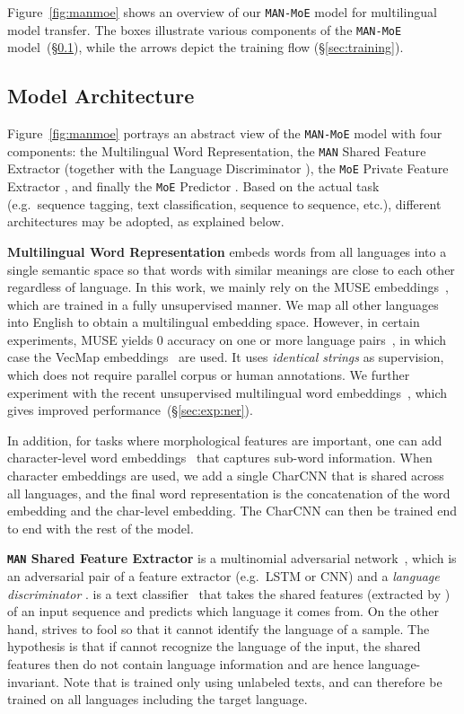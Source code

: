 \documentclass[11pt,a4paper]{article}
\newcommand{\secref}[1]{\S\ref{#1}}
\newcommand{\manmoe}{\texttt{MAN-MoE}}
\newcommand{\man}{\texttt{MAN}}
\newcommand{\moe}{\texttt{MoE}}
\begin{document}
Figure~\ref{fig:manmoe} shows an overview of our \manmoe{} model for multilingual model transfer.
The boxes illustrate various components of the \manmoe{} model~(\secref{sec:model_arch}), while the arrows depict the training flow (\secref{sec:training}).

\subsection{Model Architecture}\label{sec:model_arch}

Figure~\ref{fig:manmoe} portrays an abstract view of the \manmoe{} model with four components: the Multilingual Word Representation, the \man{} Shared Feature Extractor  (together with the Language Discriminator ), the \moe{} Private Feature Extractor , and finally the \moe{} Predictor .
Based on the actual task (e.g.~sequence tagging, text classification, sequence to sequence, etc.), different architectures may be adopted, as explained below.

\noindent\textbf{Multilingual Word Representation}
embeds words from all languages into a single semantic space so that words with similar meanings are close to each other regardless of language.
In this work, we mainly rely on the MUSE embeddings~\citep{lample2018word}, which are trained in a fully unsupervised manner.
We map all other languages into English to obtain a multilingual embedding space.
However, in certain experiments, MUSE yields 0 accuracy on one or more language pairs~\citep{P18-1072}, in which case the VecMap embeddings~\citep{P17-1042} are used.
It uses \emph{identical strings} as supervision, which does not require parallel corpus or human annotations.
We further experiment with the recent unsupervised multilingual word embeddings~\cite{chen2018umwe}, which gives improved performance~(\secref{sec:exp:ner}).

In addition, for tasks where morphological features are important, one can add character-level word embeddings~\citep{DosSantos:2014:LCR:3044805.3045095} that captures sub-word information.
When character embeddings are used, we add a single CharCNN that is shared across all languages, and the final word representation is the concatenation of the word embedding and the char-level embedding. The CharCNN can then be trained end to end with the rest of the model.

\noindent\textbf{\man{} Shared Feature Extractor}
 is a multinomial adversarial network~\citep{N18-1111}, which is an adversarial pair of a feature extractor (e.g.~LSTM or CNN) and a \emph{language discriminator} .
 is a text classifier~\citep{D14-1181} that takes the shared features (extracted by ) of an input sequence and predicts which language it comes from.
On the other hand,  strives to fool  so that it cannot identify the language of a sample.
The hypothesis is that if  cannot recognize the language of the input, the shared features then do not contain language information and are hence language-invariant.
Note that  is trained only using unlabeled texts, and can therefore be trained on all languages including the target language.
\end{document}
